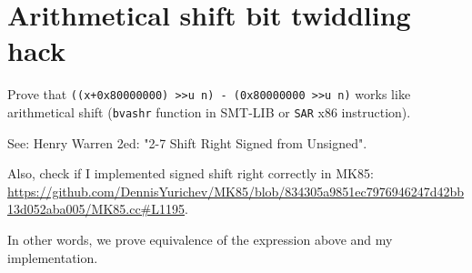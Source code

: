 \section{Arithmetical shift bit twiddling hack}

Prove that \verb|((x+0x80000000) >>u n) - (0x80000000 >>u n)| 
works like arithmetical shift (\verb|bvashr| function in SMT-LIB or \verb|SAR| x86 instruction).

See: Henry Warren 2ed: "2-7 Shift Right Signed from Unsigned".

Also, check if I implemented signed shift right correctly in MK85:
\url{https://github.com/DennisYurichev/MK85/blob/834305a9851ec7976946247d42bb13d052aba005/MK85.cc#L1195}.

In other words, we prove equivalence of the expression above and my implementation.




